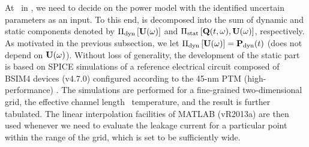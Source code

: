 At \ in , we need to decide on the power model with the identified uncertain parameters as an input.
To this end,  is decomposed into the sum of dynamic and static components denoted by $\oPower{\dyn}{\vU(\o)}$ and $\oPower{\stat}{\vTO(\t, \o), \vU(\o)}$, respectively.
As motivated in the previous subsection, we let $\oPower{\dyn}{\vU(\o)} = \vP_\dyn(\t)$ (does not depend on $\mathbf{U}(\omega)$).
Without loss of generality, the development of the static part is based on SPICE simulations of a reference electrical circuit composed of BSIM4 devices (v4.7.0) \cite{bsim} configured according to the 45-nm PTM (high-performance) \cite{ptm}.
The simulations are performed for a fine-grained two-dimensional grid, the effective channel length \versus\ temperature, and the result is further tabulated.
The linear interpolation facilities of MATLAB (vR2013a) \cite{matlab} are then used whenever we need to evaluate the leakage current for a particular point within the range of the grid, which is set to be sufficiently wide.
